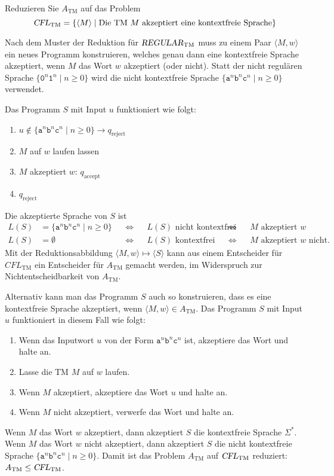 Reduzieren Sie $A_{\text{TM}}$ auf das Problem
\[
\textsl{CFL}_{\text{TM}}
=
\{
\langle M\rangle
\mid
\text{Die TM $M$ akzeptiert eine kontextfreie Sprache}
\}
\]

\begin{loesung}
Nach dem Muster der Reduktion für $\textsl{REGULAR}_{\text{TM}}$
muss zu einem Paar $\langle M,w\rangle$ ein neues Programm konstruieren,
welches genau dann eine kontextfreie Sprache akzeptiert, wenn 
$M$ das Wort $w$ akzeptiert (oder nicht).
Statt der nicht regulären Sprache $\{\texttt{0}^n\texttt{1}^n\mid n\ge 0\}$
wird die nicht kontextfreie Sprache
$\{\texttt{a}^n\texttt{b}^n\texttt{c}^n\mid n\ge 0\}$ verwendet.

Das Programm $S$ mit Input $u$ funktioniert wie folgt:
\begin{enumerate}
\item
$u\not\in \{\texttt{a}^n\texttt{b}^n\texttt{c}^n\mid n\ge 0\}
\rightarrow
q_{\text{reject}}$
\item
$M$ auf $w$ laufen lassen
\item
$M$ akzeptiert $w$: $q_{\text{accept}}$
\item
$q_{\text{reject}}$
\end{enumerate}
Die akzeptierte Sprache von $S$ ist 
\begin{align*}
L(S) &= \{\texttt{a}^n\texttt{b}^n\texttt{c}^n\mid n\ge 0\}
&&\Leftrightarrow&
&\text{$L(S)$ nicht kontextfrei}
&&\Leftrightarrow&
&\text{$M$ akzeptiert $w$}
\\
L(S) &= \emptyset
&&\Leftrightarrow&
&\text{$L(S)$ kontextfrei}
&&\Leftrightarrow&
&\text{$M$ akzeptiert $w$ nicht.}
\end{align*}
Mit der Reduktionsabbildung $\langle M,w\rangle\mapsto \langle S\rangle$
kann aus einem Entscheider für $\textit{CFL}_{\text{TM}}$ ein
Entscheider für $A_{\text{TM}}$ gemacht werden, im Widerspruch zur 
Nichtentscheidbarkeit von $A_{\text{TM}}$.

Alternativ kann man das Programm $S$ auch so konstruieren, dass es
eine kontextfreie Sprache akzeptiert, wenn
$\langle M,w\rangle\in A_{\text{TM}}$.
Das Programm $S$ mit Input $u$ funktioniert in diesem Fall wie folgt:
\begin{enumerate}
\item
Wenn das Inputwort $u$ von der Form
$\texttt{a}^n\texttt{b}^n\texttt{c}^n$
ist, akzeptiere das Wort und halte an.
\item 
Lasse die TM $M$ auf $w$ laufen.
\item
Wenn $M$ akzeptiert, akzeptiere das Wort $u$ und halte an.
\item
Wenn $M$ nicht akzeptiert, verwerfe das Wort und halte an.
\end{enumerate}
Wenn $M$ das Wort $w$ akzeptiert, dann akzeptiert $S$ die
kontextfreie Sprache $\Sigma^*$.
Wenn $M$ das Wort $w$ nicht akzeptiert, dann akzeptiert $S$ die
nicht kontextfreie Sprache
$\{\texttt{a}^n\texttt{b}^n\texttt{c}^n \mid n\ge 0\}$.
Damit ist das Problem $A_{\text{TM}}$ auf $\textsl{CFL}_{\text{TM}}$
reduziert: $A_{\text{TM}}\le \textsl{CFL}_{\text{TM}}$.
\end{loesung}
